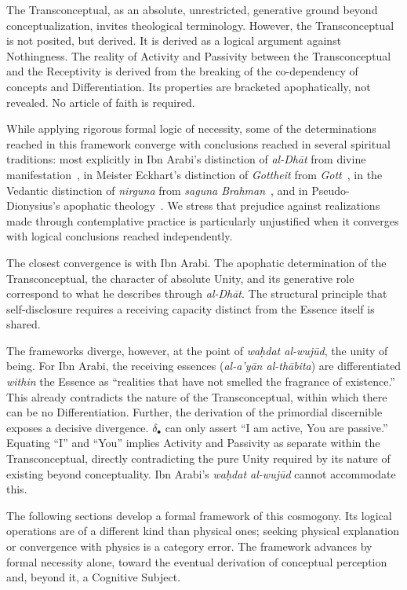 \documentclass[11pt, a4paper]{article}
\theoremstyle{formalism}
\begin{document}
The Transconceptual, as an absolute, unrestricted, generative ground beyond
conceptualization, invites theological terminology. However, the
Transconceptual is not posited, but derived. It is derived as a logical
argument against Nothingness. The reality of Activity and Passivity between the
Transconceptual and the Receptivity is derived from the breaking of the
co-dependency of concepts and Differentiation. Its properties are bracketed
apophatically, not revealed. No article of faith is required.

While applying rigorous formal logic of necessity, some of the determinations
reached in this framework converge with conclusions reached in several
spiritual traditions: most explicitly in Ibn Arabi's distinction of
\textit{al-Dh\=at} from divine manifestation~\cite{IbnArabi1203}, in Meister
Eckhart's distinction of \textit{Gottheit} from \textit{Gott}~\cite{Eckhart1300},
in the Vedantic distinction of \textit{nirguna} from \textit{saguna Brahman}~\cite{Shankara800}, and in
Pseudo-Dionysius's apophatic theology~\cite{PseudoDionysius500}. We stress
that prejudice against realizations made through contemplative practice is
particularly unjustified when it converges with logical conclusions reached
independently.

The closest convergence is with Ibn Arabi. The apophatic determination of the
Transconceptual, the character of absolute Unity, and its generative role
correspond to what he describes through \textit{al-Dh\=at}. The structural
principle that self-disclosure requires a receiving capacity distinct from
the Essence itself is shared.

The frameworks diverge, however, at the point of \textit{wa\d{h}dat
al-wuj\=ud}, the unity of being. For Ibn Arabi, the receiving essences
(\textit{al-a'y\=an al-th\=abita}) are differentiated \textit{within} the
Essence as ``realities that have not smelled the fragrance of existence.''
This already contradicts the nature of the Transconceptual, within which
there can be no Differentiation. Further, the derivation of the primordial
discernible exposes a decisive divergence. $\delta_\bullet$ can only assert
``I am active, You are passive.'' Equating ``I'' and ``You'' implies Activity
and Passivity as separate within the Transconceptual, directly contradicting
the pure Unity required by its nature of existing beyond conceptuality. Ibn
Arabi's \textit{wa\d{h}dat al-wuj\=ud} cannot accommodate this.

The following sections develop a formal framework of this cosmogony. Its
logical operations are of a different kind than physical ones; seeking
physical explanation or convergence with physics is a category error. The
framework advances by formal necessity alone, toward the eventual derivation
of conceptual perception and, beyond it, a Cognitive Subject.
\end{document}
